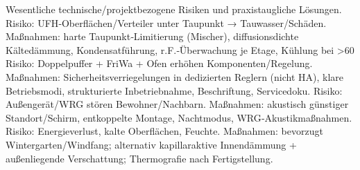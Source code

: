 \markdownRendererDocumentBegin
\markdownRendererSectionBegin
{}\markdownRendererInterblockSeparator
{}Wesentliche technische/projektbezogene Risiken und praxistaugliche Lösungen.\markdownRendererInterblockSeparator
{}\markdownRendererSectionBegin
{}\markdownRendererInterblockSeparator
{}\markdownRendererUlBeginTight
\markdownRendererUlItem Risiko: UFH‑Oberflächen/Verteiler unter Taupunkt → Tauwasser/Schäden.\markdownRendererUlItemEnd 
\markdownRendererUlItem Maßnahmen: harte Taupunkt‑Limitierung (Mischer), diffusionsdichte Kältedämmung, Kondensatführung, r.F.‑Überwachung je Etage, Kühlung bei >60 \markdownRendererUlItemEnd 
\markdownRendererUlEndTight \markdownRendererInterblockSeparator
{}
\markdownRendererSectionEnd \markdownRendererSectionBegin
{}\markdownRendererInterblockSeparator
{}\markdownRendererUlBeginTight
\markdownRendererUlItem Risiko: Doppelpuffer + FriWa + Ofen erhöhen Komponenten/Regelung.\markdownRendererUlItemEnd 
\markdownRendererUlItem Maßnahmen: Sicherheitsverriegelungen in dedizierten Reglern (nicht HA), klare Betriebsmodi, strukturierte Inbetriebnahme, Beschriftung, Servicedoku.\markdownRendererUlItemEnd 
\markdownRendererUlEndTight \markdownRendererInterblockSeparator
{}
\markdownRendererSectionEnd \markdownRendererSectionBegin
{}\markdownRendererInterblockSeparator
{}\markdownRendererUlBeginTight
\markdownRendererUlItem Risiko: Außengerät/WRG stören Bewohner/Nachbarn.\markdownRendererUlItemEnd 
\markdownRendererUlItem Maßnahmen: akustisch günstiger Standort/Schirm, entkoppelte Montage, Nachtmodus, WRG‑Akustikmaßnahmen.\markdownRendererUlItemEnd 
\markdownRendererUlEndTight \markdownRendererInterblockSeparator
{}
\markdownRendererSectionEnd \markdownRendererSectionBegin
{}\markdownRendererInterblockSeparator
{}\markdownRendererUlBeginTight
\markdownRendererUlItem Risiko: Energieverlust, kalte Oberflächen, Feuchte.\markdownRendererUlItemEnd 
\markdownRendererUlItem Maßnahmen: bevorzugt Wintergarten/Windfang; alternativ kapillaraktive Innendämmung + außenliegende Verschattung; Thermografie nach Fertigstellung.\markdownRendererUlItemEnd 
\markdownRendererUlEndTight \markdownRendererInterblockSeparator
{}
\markdownRendererSectionEnd \markdownRendererSectionBegin
{}\markdownRendererInterblockSeparator
{}\markdownRendererUlBeginTight
